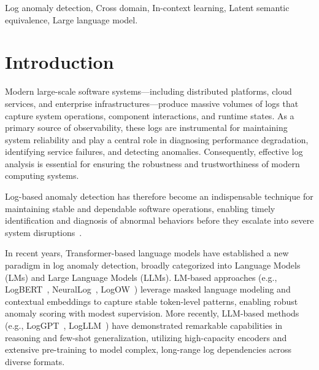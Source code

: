 \documentclass[lettersize,journal]{IEEEtran}
\begin{document}
\begin{IEEEkeywords}
Log anomaly detection, Cross domain, In-context learning, Latent semantic equivalence, Large language model.
\end{IEEEkeywords}

\section{Introduction}
Modern large-scale software systems—including distributed platforms, cloud services, and enterprise infrastructures—produce massive volumes of logs that capture system operations, component interactions, and runtime states. As a primary source of observability, these logs are instrumental for maintaining system reliability and play a central role in diagnosing performance degradation, identifying service failures, and detecting anomalies. Consequently, effective log analysis is essential for ensuring the robustness and trustworthiness of modern computing systems.

Log-based anomaly detection has therefore become an indispensable technique for maintaining stable and dependable software operations, enabling timely identification and diagnosis of abnormal behaviors before they escalate into severe system disruptions~\cite{chalapathy2019deep,he2021survey,he2016experience}. 

In recent years, Transformer-based language models have established a new paradigm in log anomaly detection, broadly categorized into Language Models (LMs) and Large Language Models (LLMs). LM-based approaches (e.g., LogBERT~\cite{guo2021logbert}, NeuralLog~\cite{chen2021neurallog}, LogOW~\cite{ye2025logow}) leverage masked language modeling and contextual embeddings to capture stable token-level patterns, enabling robust anomaly scoring with modest supervision. More recently, LLM-based methods (e.g., LogGPT~\cite{han2023loggpt}, LogLLM~\cite{guan2024logllm}) have demonstrated remarkable capabilities in reasoning and few-shot generalization, utilizing high-capacity encoders and extensive pre-training to model complex, long-range log dependencies across diverse formats.
\end{document}
